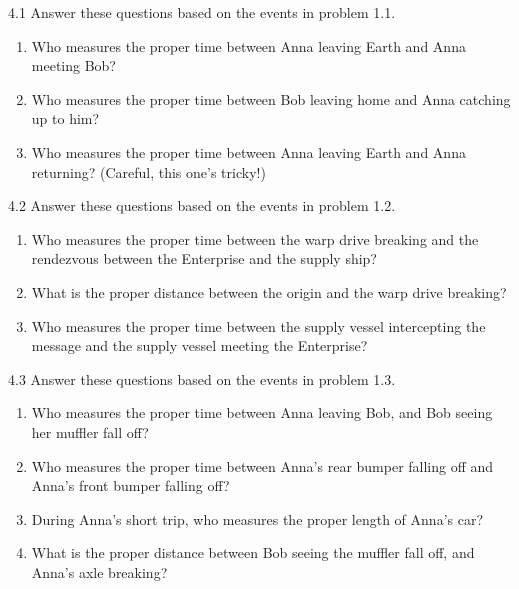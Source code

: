 4.1 Answer these questions based on the events in problem 1.1.
\begin{enumerate}[nosep,label=(\emph{\alph*})]
\item Who measures the proper time between Anna leaving Earth and Anna meeting Bob?
\answerspace{0.3in}

\item Who measures the proper time between Bob leaving home and Anna catching up to him? 
\answerspace{0.3in}

\item Who measures the proper time between Anna leaving Earth and Anna returning?  (Careful, this one's tricky!)
\answerspace{0.3in}

\end{enumerate}
4.2 Answer these questions based on the events in problem 1.2.
\begin{enumerate}[nosep,label=(\emph{\alph*})]
\item Who measures the proper time between the warp drive breaking and the rendezvous between the Enterprise and the supply ship?
\answerspace{0.3in}

\item What is the proper distance between the origin and the warp drive breaking?
\answerspace{0.3in}

\item Who measures the proper time between the supply vessel intercepting the message and the supply vessel meeting the Enterprise?
\answerspace{0.3in}

\end{enumerate}

4.3 Answer these questions based on the events in problem 1.3.
\begin{enumerate}[nosep,label=(\emph{\alph*})]
\item Who measures the proper time between Anna leaving Bob, and Bob seeing her muffler fall off?  
\answerspace{0.3in}

\item Who measures the proper time between Anna's rear bumper falling off and Anna's front bumper falling off?
\answerspace{0.3in}

\item During Anna's short trip, who measures the proper length of Anna's car?
\answerspace{0.3in}

\item What is the proper distance between Bob seeing the muffler fall off, and Anna's axle breaking?
\answerspace{0.3in}

\end{enumerate}

